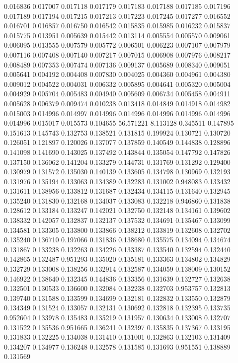 0.016836
0.017007
0.017118
0.017179
0.017183
0.017188
0.017185
0.017196
0.017189
0.017194
0.017215
0.017213
0.017223
0.017245
0.017277
0.016552
0.016701
0.016857
0.016750
0.016542
0.015835
0.015985
0.016232
0.015837
0.015775
0.013951
0.005639
0.015442
0.013114
0.005554
0.005570
0.009061
0.006095
0.013555
0.007579
0.005772
0.006501
0.006223
0.007107
0.007979
0.007116
0.007408
0.007140
0.007217
0.007015
0.006908
0.007976
0.008217
0.008489
0.007353
0.007474
0.007136
0.009137
0.005689
0.008340
0.009051
0.005641
0.004192
0.004408
0.007830
0.004025
0.004360
0.004961
0.004380
0.009012
0.004522
0.004031
0.006332
0.005895
0.004641
0.005320
0.005004
0.004929
0.005704
0.005483
0.004940
0.005609
0.006734
0.005458
0.004911
0.005628
0.006379
0.009474
0.010238
0.013418
0.014849
0.014918
0.014982
0.015003
0.014996
0.014997
0.014996
0.014996
0.014996
0.014996
0.014996
0.014996
0.015017
0.015573
0.104655
56.571221
8.113128
0.345511
0.147895
0.151613
0.145743
0.132753
0.138521
0.131815
0.199924
0.130721
0.130720
0.126051
0.121897
0.120026
0.137077
0.137859
0.140549
0.144838
0.128896
0.141098
0.141690
0.143025
0.137492
0.143844
0.135054
0.147792
0.147826
0.137150
0.136062
0.141204
0.133279
0.144731
0.131769
0.131292
0.129400
0.130979
0.131572
0.135030
0.140139
0.133605
0.134798
0.130969
0.132193
0.131976
0.135194
0.133063
0.134389
0.132283
0.131002
0.948083
0.133432
0.131611
0.138956
0.133812
0.131687
0.132434
0.134115
0.131640
0.132945
0.135240
0.131830
0.132168
0.134037
0.133083
0.132218
0.946860
0.131838
0.128612
0.133184
0.133247
0.142021
0.132750
0.132148
0.134161
0.139602
0.138332
0.142057
0.132837
0.132137
0.137532
0.134691
0.135467
0.133099
0.134581
0.133305
0.133800
0.133866
0.138212
0.133819
0.132608
0.132702
0.135240
0.136710
0.197066
0.131836
0.138680
0.135575
0.134094
0.134674
0.131867
0.133238
0.132263
0.134226
0.133387
0.133540
0.132594
0.132440
0.142865
0.132487
0.951293
0.135020
0.135181
0.133363
0.134802
0.134829
0.132729
0.133008
0.138256
0.132914
0.132587
0.134059
0.138009
0.130152
0.146922
0.138640
0.132345
0.144836
0.133356
0.131639
0.132727
0.132638
0.132501
0.130533
0.136600
0.132084
0.132238
0.132703
0.953757
0.132813
0.139740
0.131588
0.133599
0.134699
0.132181
0.132832
0.133550
0.132879
0.134349
0.131524
0.133057
0.132131
0.130692
0.132818
0.132395
0.133735
0.952604
0.133978
0.135483
0.135219
0.131957
0.130634
0.133008
0.132707
0.131522
0.135536
0.951665
0.136241
0.132397
0.135835
0.137367
0.133195
0.131833
0.132225
0.134038
0.131410
0.131001
0.132863
0.132103
0.131409
0.134207
0.134977
0.136248
0.132578
0.131585
0.131693
0.951551
0.138889
0.131569
